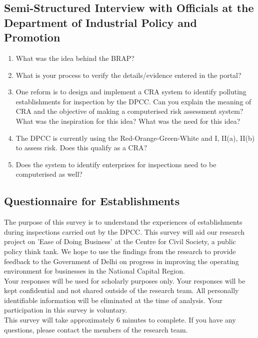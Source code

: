\documentclass[a4paper, 12pt, twoside]{article}
\begin{document}
		\subsection*{Semi-Structured Interview with Officials at the Department of Industrial Policy and Promotion}
                    \begin{mdframed}[backgroundcolor=gray!20]
		\begin{enumerate}
			\item{What was the idea behind the BRAP?}
			\item{What is your process to verify the details/evidence entered in the portal?}
			\item{One reform is to design and implement a CRA system to identify polluting establishments for inspection by the DPCC. Can you explain the meaning of CRA and the objective of making a computerised risk assessment system? What was the inspiration for this idea? What was the need for this idea?}
			\item{The DPCC is currently using the Red-Orange-Green-White and I, II(a), II(b) to assess risk. Does this qualify as a CRA?}
			\item{Does the system to identify enterprises for inspections need to be computerised as well?}
		\end{enumerate}
		\end{mdframed}
		
		\subsection*{Questionnaire for Establishments}	
			The purpose of this survey is to understand the experiences of establishments during inspections carried out by the DPCC. This survey will aid our research project on 'Ease of Doing Business' at the Centre for Civil Society, a public policy think tank. We hope to use the findings from the research to provide feedback to the Government of Delhi on progress in improving the operating environment for businesses in the National Capital Region. \\
		
		Your responses will be used for scholarly purposes only. Your responses will be kept confidential and not shared outside of the research team. All personally identifiable information will be eliminated at the time of analysis. Your participation in this survey is voluntary. \\
		
		This survey will take approximately 6 minutes to complete. If you have any questions, please contact the members of the research team. \\
		
\end{document}
